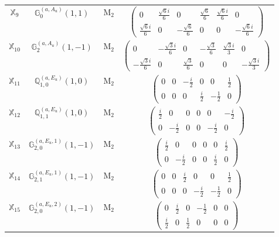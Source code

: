 \documentclass[fleqn,10pt,landscape]{article}
\begin{document}
\begin{itemize}
\begin{center}
\begin{longtable}{c|c|c|c}
$ \mathbb{X}_{9} $ & $\mathbb{G}_{0}^{(a,A_{u})}(1,1)$ & M$_{2}$ & $\begin{pmatrix} 0 & \frac{\sqrt{6} i}{6} & 0 & \frac{\sqrt{6}}{6} & \frac{\sqrt{6} i}{6} & 0 \\ \frac{\sqrt{6} i}{6} & 0 & - \frac{\sqrt{6}}{6} & 0 & 0 & - \frac{\sqrt{6} i}{6} \end{pmatrix}$ \\
$ \mathbb{X}_{10} $ & $\mathbb{G}_{2}^{(a,A_{u})}(1,-1)$ & M$_{2}$ & $\begin{pmatrix} 0 & - \frac{\sqrt{3} i}{6} & 0 & - \frac{\sqrt{3}}{6} & \frac{\sqrt{3} i}{3} & 0 \\ - \frac{\sqrt{3} i}{6} & 0 & \frac{\sqrt{3}}{6} & 0 & 0 & - \frac{\sqrt{3} i}{3} \end{pmatrix}$ \\
$ \mathbb{X}_{11} $ & $\mathbb{Q}_{1,0}^{(a,E_{u})}(1,0)$ & M$_{2}$ & $\begin{pmatrix} 0 & 0 & - \frac{i}{2} & 0 & 0 & \frac{1}{2} \\ 0 & 0 & 0 & \frac{i}{2} & - \frac{1}{2} & 0 \end{pmatrix}$ \\
$ \mathbb{X}_{12} $ & $\mathbb{Q}_{1,1}^{(a,E_{u})}(1,0)$ & M$_{2}$ & $\begin{pmatrix} \frac{i}{2} & 0 & 0 & 0 & 0 & - \frac{i}{2} \\ 0 & - \frac{i}{2} & 0 & 0 & - \frac{i}{2} & 0 \end{pmatrix}$ \\
$ \mathbb{X}_{13} $ & $\mathbb{G}_{2,0}^{(a,E_{u},1)}(1,-1)$ & M$_{2}$ & $\begin{pmatrix} \frac{i}{2} & 0 & 0 & 0 & 0 & \frac{i}{2} \\ 0 & - \frac{i}{2} & 0 & 0 & \frac{i}{2} & 0 \end{pmatrix}$ \\
$ \mathbb{X}_{14} $ & $\mathbb{G}_{2,1}^{(a,E_{u},1)}(1,-1)$ & M$_{2}$ & $\begin{pmatrix} 0 & 0 & \frac{i}{2} & 0 & 0 & \frac{1}{2} \\ 0 & 0 & 0 & - \frac{i}{2} & - \frac{1}{2} & 0 \end{pmatrix}$ \\
$ \mathbb{X}_{15} $ & $\mathbb{G}_{2,0}^{(a,E_{u},2)}(1,-1)$ & M$_{2}$ & $\begin{pmatrix} 0 & \frac{i}{2} & 0 & - \frac{1}{2} & 0 & 0 \\ \frac{i}{2} & 0 & \frac{1}{2} & 0 & 0 & 0 \end{pmatrix}$ \\

\end{longtable}
\end{center}
\end{itemize}
\end{document}
